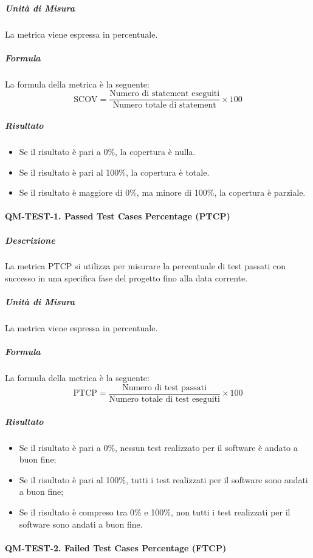 			\subparagraph{Unità di Misura}
			La metrica viene espressa in percentuale.

			\subparagraph{Formula}
			La formula della metrica è la seguente:
			\[
				\text{SCOV} = \frac{\text{Numero di statement eseguiti}}{\text{Numero totale di statement}} \times 100
			\]

			\subparagraph{Risultato}
			\begin{itemize}
				\item Se il risultato è pari a 0\%, la copertura è nulla.
				\item Se il risultato è pari al 100\%, la copertura è totale.
				\item Se il risultato è maggiore di 0\%, ma minore di 100\%, la copertura è parziale.
			\end{itemize}

			\paragraph{QM-TEST-1. Passed Test Cases Percentage (PTCP)}

				\subparagraph{Descrizione}
				La metrica PTCP si utilizza per misurare la percentuale di test passati con successo in una specifica fase del progetto fino alla data corrente.

				\subparagraph{Unità di Misura}
				La metrica viene espressa in percentuale.

				\subparagraph{Formula}
				La formula della metrica è la seguente:
				\[
					\text{PTCP} = \frac{\text{Numero di test passati}}{\text{Numero totale di test eseguiti}} \times 100
				\]

				\subparagraph{Risultato}
				\begin{itemize}
					\item Se il risultato è pari a 0\%, nessun test realizzato per il software è andato a buon fine;
					\item Se il risultato è pari al 100\%, tutti i test realizzati per il software sono andati a buon fine;
					\item Se il risultato è compreso tra 0\% e 100\%, non tutti i test realizzati per il software sono andati a buon fine.
				\end{itemize}

			\paragraph{QM-TEST-2. Failed Test Cases Percentage (FTCP)}

